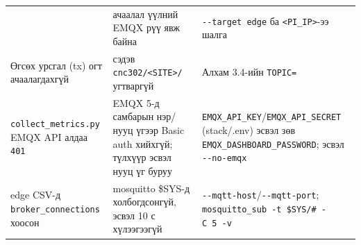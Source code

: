 \begin{longtable}[]{@{}lll@{}}
\begin{minipage}[t]{0.30\columnwidth}
\end{minipage} & \begin{minipage}[t]{0.30\columnwidth}\raggedright
ачаалал үүлний EMQX рүү явж байна\strut
\end{minipage} & \begin{minipage}[t]{0.30\columnwidth}\raggedright
\texttt{-\/-target\ edge} ба \texttt{\textless{}PI\_\allowbreak{}IP\textgreater{}}-ээ шалга\strut
\end{minipage}\tabularnewline
\begin{minipage}[t]{0.30\columnwidth}\raggedright
Өгсөх урсгал (tx) огт ачаалагдахгүй\strut
\end{minipage} & \begin{minipage}[t]{0.30\columnwidth}\raggedright
сэдэв \texttt{cnc302/\allowbreak{}\textless{}SITE\textgreater{}/\allowbreak{}} угтваргүй\strut
\end{minipage} & \begin{minipage}[t]{0.30\columnwidth}\raggedright
Алхам 3.4-ийн \texttt{TOPIC=}\strut
\end{minipage}\tabularnewline
\begin{minipage}[t]{0.30\columnwidth}\raggedright
\texttt{collect\_\allowbreak{}metrics.\allowbreak{}py} EMQX API алдаа \texttt{401}\strut
\end{minipage} & \begin{minipage}[t]{0.30\columnwidth}\raggedright
EMQX 5-д самбарын нэр/нууц үгээр Basic auth хийхгүй; түлхүүр эсвэл нууц үг буруу\strut
\end{minipage} & \begin{minipage}[t]{0.30\columnwidth}\raggedright
\texttt{EMQX\_\allowbreak{}API\_\allowbreak{}KEY}/\allowbreak\texttt{EMQX\_\allowbreak{}API\_\allowbreak{}SECRET} (stack/.env) эсвэл зөв \texttt{EMQX\_\allowbreak{}DASHBOARD\_\allowbreak{}PASSWORD}; эсвэл \texttt{-\/-no-emqx}\strut
\end{minipage}\tabularnewline
\begin{minipage}[t]{0.30\columnwidth}\raggedright
edge CSV-д \texttt{broker\_\allowbreak{}connections} хоосон\strut
\end{minipage} & \begin{minipage}[t]{0.30\columnwidth}\raggedright
mosquitto \$SYS-д холбогдсонгүй, эсвэл 10 с хүлээгээгүй\strut
\end{minipage} & \begin{minipage}[t]{0.30\columnwidth}\raggedright
\texttt{-\/-mqtt-host}/\allowbreak\texttt{-\/-mqtt-port}; \texttt{mosquitto\_sub\ -t\ \textquotesingle{}\$SYS/\#\textquotesingle{}\ -C\ 5\ -v}\strut

\end{minipage}
\end{longtable}
